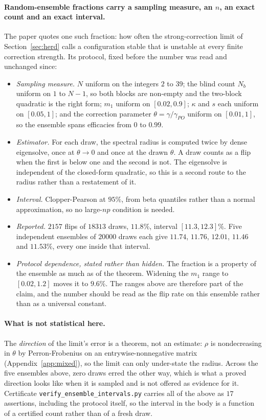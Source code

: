 \paragraph{Random-ensemble fractions carry a sampling measure, an $n$, an exact count and an exact interval.} The paper quotes one such fraction: how often the strong-correction limit of Section~\ref{sec:herd} calls a configuration stable that is unstable at every finite correction strength. Its protocol, fixed before the number was read and unchanged since:

\begin{itemize}\itemsep2pt
\item \emph{Sampling measure.} $N$ uniform on the integers $2$ to $39$; the blind count $N_b$ uniform on $1$ to $N-1$, so both blocks are non-empty and the two-block quadratic is the right form; $m_1$ uniform on $[0.02, 0.9]$; $\kappa$ and $s$ each uniform on $[0.05, 1]$; and the correction parameter $\theta = \gamma/\gamma_{PO}$ uniform on $[0.01, 1]$, so the ensemble spans efficacies from $0$ to $0.99$.
\item \emph{Estimator.} For each draw, the spectral radius is computed twice by dense eigensolve, once at $\theta \to 0$ and once at the drawn $\theta$. A draw counts as a flip when the first is below one and the second is not. The eigensolve is independent of the closed-form quadratic, so this is a second route to the radius rather than a restatement of it.
\item \emph{Interval.} Clopper-Pearson at $95\%$, from beta quantiles rather than a normal approximation, so no large-$np$ condition is needed.
\item \emph{Reported.} $2157$ flips of $18313$ draws, $11.8\%$, interval $[11.3, 12.3]\%$. Five independent ensembles of $20000$ draws each give $11.74$, $11.76$, $12.01$, $11.46$ and $11.53\%$, every one inside that interval.
\item \emph{Protocol dependence, stated rather than hidden.} The fraction is a property of the ensemble as much as of the theorem. Widening the $m_1$ range to $[0.02, 1.2]$ moves it to $9.6\%$. The ranges above are therefore part of the claim, and the number should be read as the flip rate on this ensemble rather than as a universal constant.
\end{itemize}

\paragraph{What is not statistical here.} The \emph{direction} of the limit's error is a theorem, not an estimate: $\rho$ is nondecreasing in $\theta$ by Perron-Frobenius on an entrywise-nonnegative matrix (Appendix~\ref{app:mixed}), so the limit can only under-state the radius. Across the five ensembles above, zero draws erred the other way, which is what a proved direction looks like when it is sampled and is not offered as evidence for it. Certificate \texttt{verify\_ensemble\_intervals.py} carries all of the above as $17$ assertions, including the protocol itself, so the interval in the body is a function of a certified count rather than of a fresh draw.
